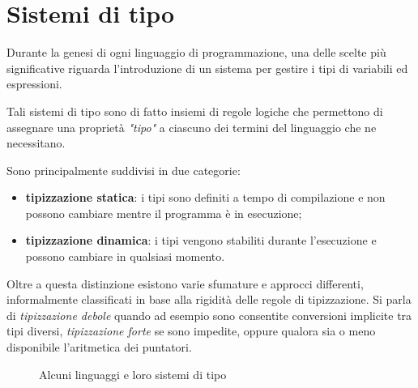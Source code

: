 \section{Sistemi di tipo}
\label{sec:3-type-systems}

Durante la genesi di ogni linguaggio di programmazione, una delle scelte più significative riguarda
l'introduzione di un sistema per gestire i tipi di variabili ed espressioni.

\noindent Tali sistemi di tipo sono di fatto insiemi di regole logiche che permettono
di assegnare una proprietà \textit{"tipo"} a ciascuno dei termini del linguaggio che ne necessitano.

\noindent Sono principalmente suddivisi in due categorie:
\begin{itemize}
    \item \textbf{tipizzazione statica}: i tipi sono definiti a tempo di compilazione
          e non possono cambiare mentre il programma è in esecuzione;
    \item \textbf{tipizzazione dinamica}: i tipi vengono stabiliti durante l'esecuzione
          e possono cambiare in qualsiasi momento.
\end{itemize}

\noindent Oltre a questa distinzione esistono varie sfumature e approcci differenti,
informalmente classificati in base alla rigidità delle regole di tipizzazione.
Si parla di \textit{tipizzazione debole} quando ad esempio sono consentite conversioni implicite tra tipi diversi,
\textit{tipizzazione forte} se sono impedite, oppure qualora sia o meno disponibile l'aritmetica dei puntatori.

\newpage

\begin{figure}[H]
    \centering
    \caption{Alcuni linguaggi e loro sistemi di tipo}
    \label{fig:3-languages-type-systems}
    \vspace{4mm}
\end{figure}

